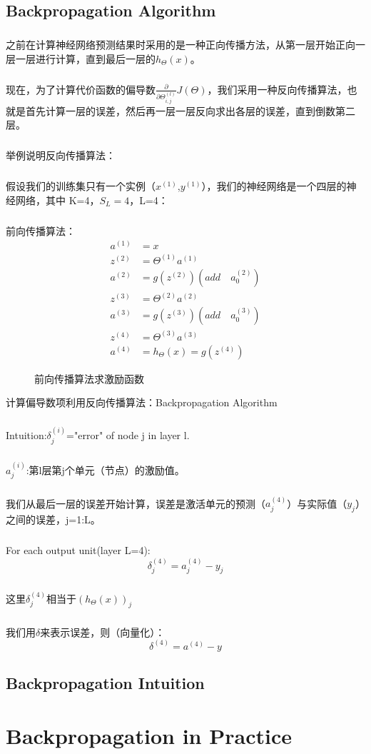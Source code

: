 \documentclass{article}
\begin{document}
\begin{CJK}{UTF8}{gbsn}
\subsection{Backpropagation Algorithm}
\subparagraph{}
之前在计算神经网络预测结果时采用的是一种正向传播方法，从第一层开始正向一层一层进行计算，直到最后一层的$h_\Theta(x)$。
\subparagraph{}
现在，为了计算代价函数的偏导数$\frac{\partial}{\partial\Theta_{i,j}^{(l)}}J(\Theta)$，我们采用一种反向传播算法，也就是首先计算一层的误差，然后再一层一层反向求出各层的误差，直到倒数第二层。
\subparagraph{}
举例说明反向传播算法：
\subparagraph{}
假设我们的训练集只有一个实例（$x^{(1)}$,$y^{(1)}$），我们的神经网络是一个四层的神经网络，其中 K=4，$S_L=4$，L=4：
\subparagraph{}
前向传播算法：
\begin{align}
a^{(1)} & =x \\
z^{(2)} & =\Theta^{(1)}a^{(1)} \\
a^{(2)} & =g(z^{(2)})(add\quad{a_0^{(2)}}) \\
z^{(3)} & =\Theta^{(2)}a^{(2)} \\
a^{(3)} & =g(z^{(3)})(add\quad{a_0^{(3)}}) \\
z^{(4)} & =\Theta^{(3)}a^{(3)} \\
a^{(4)} & =h_\Theta(x)=g(z^{(4)})
\end{align}
\begin{figure}[H]
\caption{前向传播算法求激励函数}
\label{fig:504}
\end{figure}
计算偏导数项利用反向传播算法：Backpropagation Algorithm
\subparagraph{}
Intuition:$\delta_j^{(i)}$="error" of node j in layer l.
\subparagraph{}
$a_j^{(i)}$:第l层第j个单元（节点）的激励值。
\subparagraph{}
我们从最后一层的误差开始计算，误差是激活单元的预测（$a_j^{(4)}$）与实际值（$y_j$）之间的误差，j=1:L。
\subparagraph{}
For each output unit(layer L=4):
\begin{equation}
\delta_j^{(4)}=a_j^{(4)}-y_j
\end{equation}
\subparagraph{}
这里$\delta_j^{(4)}$相当于$(h_\Theta(x))_j$
\subparagraph{}
我们用$\delta$来表示误差，则（向量化）：
\begin{equation}
\delta^{(4)}=a^{(4)}-y
\end{equation}
\subsection{Backpropagation Intuition}
\subparagraph{}
\section{Backpropagation in Practice}

\end{CJK}
\end{document}
